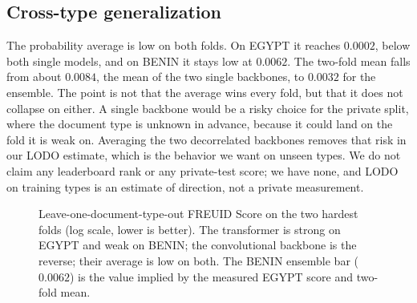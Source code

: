 \documentclass[11pt,a4paper]{article}
\begin{document}
\subsection{Cross-type generalization}
The probability average is low on both folds. On EGYPT it reaches $0.0002$, below both single models, and on
BENIN it stays low at $0.0062$. The two-fold mean falls from about $0.0084$, the mean of the two single
backbones, to $0.0032$ for the ensemble. The point is not that the average wins every fold, but that it does
not collapse on either. A single backbone would be a risky choice for the private split, where the document
type is unknown in advance, because it could land on the fold it is weak on. Averaging the two decorrelated
backbones removes that risk in our LODO estimate, which is the behavior we want on unseen types. We do not
claim any leaderboard rank or any private-test score; we have none, and LODO on training types is an estimate
of direction, not a private measurement.

\begin{figure}[t]
\centering
{}
\caption{Leave-one-document-type-out FREUID Score on the two hardest folds (log scale, lower is better). The
transformer is strong on EGYPT and weak on BENIN; the convolutional backbone is the reverse; their average
is low on both. The BENIN ensemble bar ($0.0062$) is the value implied by the measured EGYPT score and
two-fold mean.}
\label{fig:folds}
\end{figure}
\end{document}
